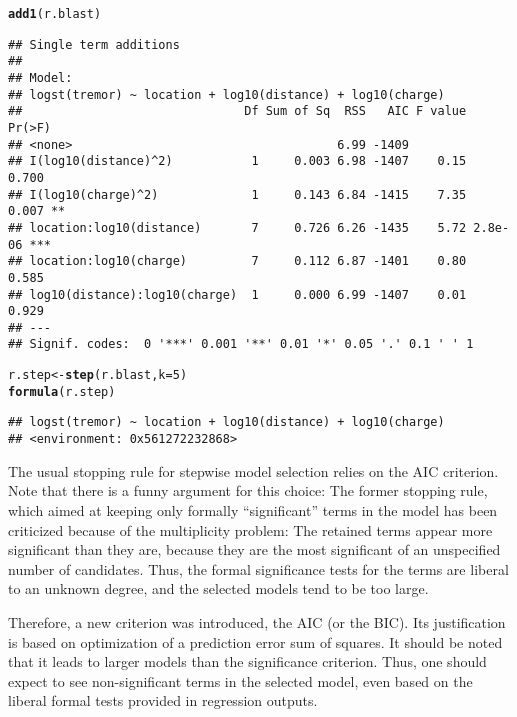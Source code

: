 \documentclass[11pt]{article}\usepackage[]{graphicx}\usepackage[]{color}
\makeatletter
\newcommand{\hlnum}[1]{\textcolor[rgb]{0.686,0.059,0.569}{#1}}%
\newcommand{\hlstd}[1]{\textcolor[rgb]{0.345,0.345,0.345}{#1}}%
\newcommand{\hlkwb}[1]{\textcolor[rgb]{0.69,0.353,0.396}{#1}}%
\newcommand{\hlkwc}[1]{\textcolor[rgb]{0.333,0.667,0.333}{#1}}%
\newcommand{\hlkwd}[1]{\textcolor[rgb]{0.737,0.353,0.396}{\textbf{#1}}}%
\newenvironment{kframe}{%
 \def\at@end@of@kframe{}%
 \ifinner\ifhmode%
  \def\at@end@of@kframe{\end{minipage}}%
  \begin{minipage}{\columnwidth}%
 \fi\fi%
 \def\FrameCommand##1{\hskip\@totalleftmargin \hskip-\fboxsep
 \colorbox{shadecolor}{##1}\hskip-\fboxsep
     \hskip-\linewidth \hskip-\@totalleftmargin \hskip\columnwidth}%
 \MakeFramed {\advance\hsize-\width
   \@totalleftmargin\z@ \linewidth\hsize
   \@setminipage}}%
 {\par\unskip\endMakeFramed%
 \at@end@of@kframe}
\newenvironment{knitrout}{}{} %
\makeatother
\begin{document}
\begin{knitrout}
\color{fgcolor}\begin{kframe}
\begin{alltt}
\hlkwd{add1}\hlstd{(r.blast)}
\end{alltt}
\begin{verbatim}
## Single term additions
## 
## Model:
## logst(tremor) ~ location + log10(distance) + log10(charge)
##                               Df Sum of Sq  RSS   AIC F value  Pr(>F)    
## <none>                                     6.99 -1409                    
## I(log10(distance)^2)           1     0.003 6.98 -1407    0.15   0.700    
## I(log10(charge)^2)             1     0.143 6.84 -1415    7.35   0.007 ** 
## location:log10(distance)       7     0.726 6.26 -1435    5.72 2.8e-06 ***
## location:log10(charge)         7     0.112 6.87 -1401    0.80   0.585    
## log10(distance):log10(charge)  1     0.000 6.99 -1407    0.01   0.929    
## ---
## Signif. codes:  0 '***' 0.001 '**' 0.01 '*' 0.05 '.' 0.1 ' ' 1
\end{verbatim}
\begin{alltt}
\hlstd{r.step} \hlkwb{<-} \hlkwd{step}\hlstd{(r.blast,} \hlkwc{k}\hlstd{=}\hlnum{5}\hlstd{)}
\hlkwd{formula}\hlstd{(r.step)}
\end{alltt}
\begin{verbatim}
## logst(tremor) ~ location + log10(distance) + log10(charge)
## <environment: 0x561272232868>
\end{verbatim}
\end{kframe}
\end{knitrout}

The usual stopping rule for stepwise model selection relies on the AIC
criterion. Note that there is a funny argument for this choice:
The former stopping rule, which aimed at keeping only formally
``significant'' terms in the model has been criticized because of the
multiplicity problem: The retained terms appear more significant than they
are, because they are the most significant of an unspecified number of
candidates. Thus, the formal significance tests for the terms are liberal
to an unknown degree, and the selected models tend to be too large.

Therefore, a new criterion was introduced, the AIC (or the BIC).
Its justification is based on optimization of a prediction error sum of 
squares. It should be noted that it leads to larger models than the
significance criterion. Thus, one should expect to see non-significant
terms in the selected model, even based on the liberal formal tests
provided in regression outputs.
\end{document}
